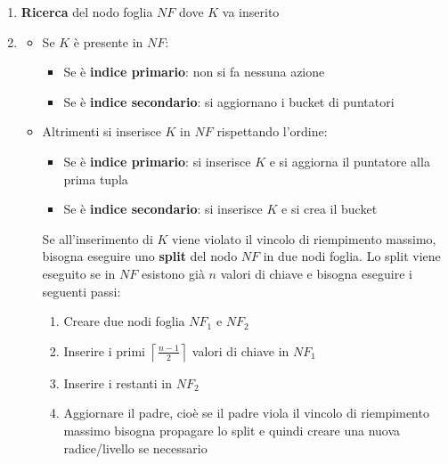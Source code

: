 \documentclass[a4paper,twoside]{article}
\begin{document}
\begin{enumerate}
  \item \textbf{Ricerca} del nodo foglia \( NF \) dove \( K \) va inserito
  \item 
  \begin{itemize}
    \item Se \( K \) è presente in \( NF \):
      \begin{itemize}
        \item Se è \textbf{indice primario}: non si fa nessuna azione
        \item Se è \textbf{indice secondario}: si aggiornano i bucket di puntatori
      \end{itemize}

    \item Altrimenti si inserisce \( K \) in \( NF \) rispettando l'ordine:
      \begin{itemize}
        \item Se è \textbf{indice primario}: si inserisce \( K \) e si aggiorna il
          puntatore alla prima tupla

        \item Se è \textbf{indice secondario}: si inserisce \( K \) e si crea
          il bucket
      \end{itemize}
      Se all'inserimento di \( K \) viene violato il vincolo di riempimento massimo,
      bisogna eseguire uno \textbf{split} del nodo \( NF \) in due nodi foglia.
      Lo split viene eseguito se in \( NF \) esistono già \( n \) valori di chiave
      e bisogna eseguire i seguenti passi:
      \begin{enumerate}
        \item Creare due nodi foglia \( NF_1 \) e \( NF_2 \) 

        \item Inserire i primi \( \left\lceil \frac{n-1}{2} \right\rceil  \) valori
          di chiave in \( NF_1 \)

        \item Inserire i restanti in \( NF_2 \)

        \item Aggiornare il padre, cioè se il padre viola il vincolo di riempimento
          massimo bisogna propagare lo split e quindi creare una nuova radice/livello
          se necessario
      \end{enumerate}
  \end{itemize}
\end{enumerate}
\end{document}
